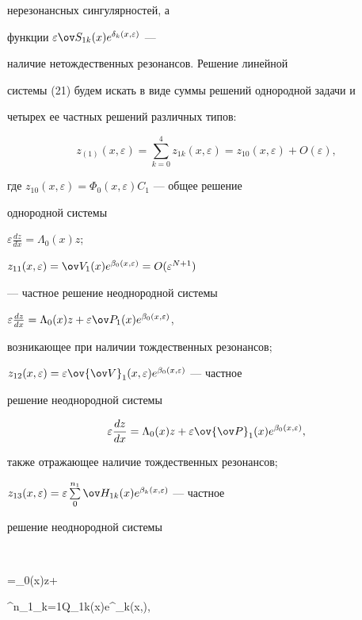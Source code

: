 нерезонансных сингулярностей, а 


функции $\varepsilon\ov S_{1k}(x)e^{\delta_k(x,\varepsilon)}$ --- 


наличие нетождественных резонансов. Решение линейной 


системы (21) будем искать в виде суммы решений однородной задачи и 


четырех ее частных решений различных типов:


$$ 


z_{(1)}(x,\varepsilon)=\sum^4_{k=0}z_{1k}(x,\varepsilon)= 


z_{10}(x,\varepsilon)+O(\varepsilon), 


$$ 


где $z_{10}(x,\varepsilon)=\Phi_0(x,\varepsilon)C_1$ --- общее решение 


однородной системы 


$\varepsilon\frac{dz}{dx}=\Lambda_0(x)z$; 


$z_{11}(x,\varepsilon)=\ov V_1(x)e^{\beta_0(x,\varepsilon)}


=O(\varepsilon^{N+1})$ 


--- частное решение неоднородной системы 


$\varepsilon\frac{dz}{dx}=\Lambda_0(x)z+\varepsilon\ov P_1(x) 


e^{\beta_0(x,\varepsilon)}$, 


возникающее при наличии тождественных резонансов; 


$z_{12}(x,\varepsilon)=\varepsilon\ov{\ov V}_1(x,\varepsilon) 


e^{\beta_0(x,\varepsilon)}$ --- частное 


решение неоднородной системы 


$$ 


\varepsilon\frac{dz}{dx}=\Lambda_0(x)z+\varepsilon 


\ov{\ov P}_1(x)e^{\beta_0(x,\varepsilon)}, 


$$ 


также отражающее наличие тождественных резонансов; 


$z_{13}(x,\varepsilon)=\varepsilon\sum\limits^{n_1}_0 


\ov H_{1k}(x)e^{\beta_k(x,\varepsilon)}$ --- частное 


решение неоднородной системы 


$$ 


\varepsilon{}=\Lambda_0(x)z+\varepsilon 


\sum^{n_1}_{k=1}\ov Q_{1k}(x)e^{\beta_k(x,\varepsilon)}, 


